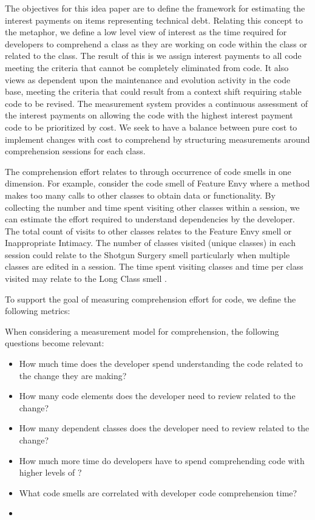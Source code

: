 The objectives for this idea paper are to define the framework for estimating the interest payments on items representing technical debt.  Relating this concept to the \TD  metaphor, we define a low level view of interest as the time required for developers to comprehend a class as they are working on code within the class or related to the class.   The result of this is we assign interest payments to all code meeting the criteria that \TD cannot be completely eliminated from code.  It also views \TD as dependent upon the maintenance and evolution activity in the code base, meeting the criteria that \TD could result from a context shift requiring stable code to be revised. The measurement system provides a continuous assessment of the interest payments on \TD allowing the code with the highest interest payment code to be prioritized by cost.  We seek to have a balance between pure cost to implement changes with cost to comprehend by structuring measurements around comprehension sessions for each class.

The comprehension effort relates to \TD through occurrence of code smells in one dimension.  For example, consider the code smell of Feature Envy  where a method makes too many calls to other classes to obtain data or functionality.  By collecting the number and time spent visiting other classes within a session, we can estimate the effort required to understand dependencies by the developer.  The total count of visits to other classes relates to the Feature Envy smell or Inappropriate Intimacy.  The number of classes visited (unique classes) in each session could  relate to the Shotgun Surgery smell particularly when multiple classes are edited in a session.  The time spent visiting classes and time per class visited may relate to the Long Class smell \cite{Fowler1999Refactoring}.  



To support the goal of measuring comprehension effort for code, we define the following metrics:

When considering a measurement model for comprehension, the following questions become relevant:

\begin{itemize}
	\item[] How much time does the developer spend understanding the code related to the change they are making?
	\item[] How many code elements does the developer need to review related to the change?
	\item[] How many dependent classes does the developer need to review related to the change?
	\item[] How much more time do developers have to spend comprehending code with higher levels of \TD?
	\item[] What code smells are correlated with developer code comprehension time?
	\item[] 
\end{itemize}

